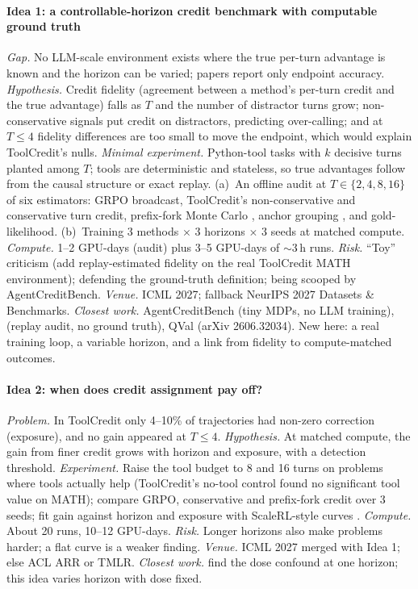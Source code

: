 \paragraph{Idea 1: a controllable-horizon credit benchmark with computable ground truth}
\emph{Gap.} No LLM-scale environment exists where the true per-turn advantage is known and the horizon can be varied; papers report only endpoint accuracy. \emph{Hypothesis.} Credit fidelity (agreement between a method's per-turn credit and the true advantage) falls as $T$ and the number of distractor turns grow; non-conservative signals put credit on distractors, predicting over-calling; and at $T\leq4$ fidelity differences are too small to move the endpoint, which would explain ToolCredit's nulls. \emph{Minimal experiment.} Python-tool tasks with $k$ decisive turns planted among $T$; tools are deterministic and stateless, so true advantages follow from the causal structure or exact replay. (a)~An offline audit at $T\in\{2,4,8,16\}$ of six estimators: GRPO broadcast, ToolCredit's non-conservative and conservative turn credit, prefix-fork Monte Carlo \citep{kazemnejad2024vineppo,ji2025tree}, anchor grouping \citep{feng2025group}, and gold-likelihood. (b)~Training 3 methods $\times$ 3 horizons $\times$ 3 seeds at matched compute. \emph{Compute.} 1--2 GPU-days (audit) plus 3--5 GPU-days of $\sim$3\,h runs. \emph{Risk.} ``Toy'' criticism (add replay-estimated fidelity on the real ToolCredit MATH environment); defending the ground-truth definition; being scooped by AgentCreditBench. \emph{Venue.} ICML 2027; fallback NeurIPS 2027 Datasets \& Benchmarks. \emph{Closest work.} AgentCreditBench (tiny MDPs, no LLM training\unverified), \citet{zhang2026credit} (replay audit, no ground truth), QVal (arXiv 2606.32034)\unverified. New here: a real training loop, a variable horizon, and a link from fidelity to compute-matched outcomes.

\paragraph{Idea 2: when does credit assignment pay off?}
\emph{Problem.} In ToolCredit only 4--10\% of trajectories had non-zero correction (exposure), and no gain appeared at $T\leq4$. \emph{Hypothesis.} At matched compute, the gain from finer credit grows with horizon and exposure, with a detection threshold. \emph{Experiment.} Raise the tool budget to 8 and 16 turns on problems where tools actually help (ToolCredit's no-tool control found no significant tool value on MATH); compare GRPO, conservative and prefix-fork credit over 3 seeds; fit gain against horizon and exposure with ScaleRL-style curves \citep{khatri2025art}. \emph{Compute.} About 20 runs, 10--12 GPU-days. \emph{Risk.} Longer horizons also make problems harder; a flat curve is a weaker finding. \emph{Venue.} ICML 2027 merged with Idea 1; else ACL ARR or TMLR. \emph{Closest work.} \citet{zhang2026credit} find the dose confound at one horizon; this idea varies horizon with dose fixed.

